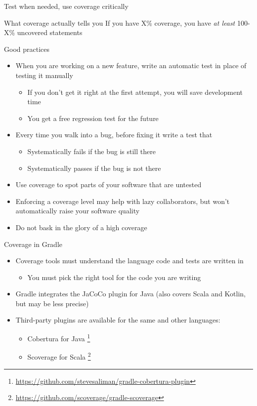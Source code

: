 \documentclass[presentation]{beamer}
\newcommand{\fnurl}[1]{\footnote{\url{#1}}}
\begin{document}
\begin{frame}[fragile]{Test when needed, use coverage critically}
    \begin{block}{What coverage actually tells you}
        If you have X\% coverage, you have \textit{at least} 100-X\% uncovered statements
    \end{block}
    Good practices
    \begin{itemize}
        \item When you are working on a new feature, write an automatic test in place of testing it manually
        \begin{itemize}
            \item If you don't get it right at the first attempt, you will save development time
            \item You get a free regression test for the future
        \end{itemize}
        \item Every time you walk into a bug, before fixing it write a test that
        \begin{itemize}
            \item Systematically fails if the bug is still there
            \item Systematically passes if the bug is not there
        \end{itemize}
        \item Use coverage to spot parts of your software that are untested
        \item Enforcing a coverage level may help with lazy collaborators, but won't automatically raise your software quality
        \item Do not bask in the glory of a high coverage
    \end{itemize}
\end{frame}

\begin{frame}[fragile]{Coverage in Gradle}
    \begin{itemize}
        \item Coverage tools must understand the language code and tests are written in
        \begin{itemize}
            \item You must pick the right tool for the code you are writing
        \end{itemize}
        \item Gradle integrates the JaCoCo plugin for Java (also covers Scala and Kotlin, but may be less precise)
        \item Third-party plugins are available for the same and other languages:
        \begin{itemize}
            \item Cobertura for Java \fnurl{https://github.com/stevesaliman/gradle-cobertura-plugin}
            \item Scoverage for Scala \fnurl{https://github.com/scoverage/gradle-scoverage}
        \end{itemize}
    \end{itemize}
\end{frame}
\end{document}
